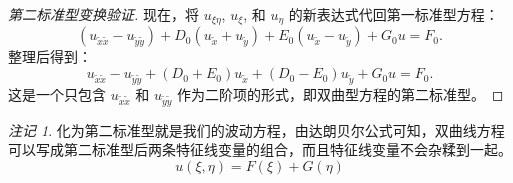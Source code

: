 \documentclass[12pt,a4paper]{article}
\numberwithin{subsection}{section}
\numberwithin{subsubsection}{subsection}
\theoremstyle{plain}
\theoremstyle{definition}
\theoremstyle{remark}
\newtheorem{remark}[theorem]{注记}
\begin{document}
\begin{proof}[第二标准型变换验证]
		现在，将 \(u_{\xi\eta}\), \(u_\xi\), 和 \(u_\eta\) 的新表达式代回第一标准型方程：
		\[
		(u_{\tilde{x}\tilde{x}} - u_{\tilde{y}\tilde{y}}) + D_0(u_{\tilde{x}} + u_{\tilde{y}}) + E_0(u_{\tilde{x}} - u_{\tilde{y}}) + G_0 u = F_0.
		\]
		整理后得到：
		\[
		u_{\tilde{x}\tilde{x}} - u_{\tilde{y}\tilde{y}} + (D_0+E_0)u_{\tilde{x}} + (D_0-E_0)u_{\tilde{y}} + G_0 u = F_0.
		\]
		这是一个只包含 \(u_{\tilde{x}\tilde{x}}\) 和 \(u_{\tilde{y}\tilde{y}}\) 作为二阶项的形式，即双曲型方程的第二标准型。
	\end{proof}
\begin{remark}
	化为第二标准型就是我们的波动方程，由达朗贝尔公式可知，双曲线方程可以写成第二标准型后两条特征线变量的组合，而且特征线变量不会杂糅到一起。
\[
u(\xi, \eta) = F(\xi) + G(\eta)
\]
\end{remark}
\end{document}
